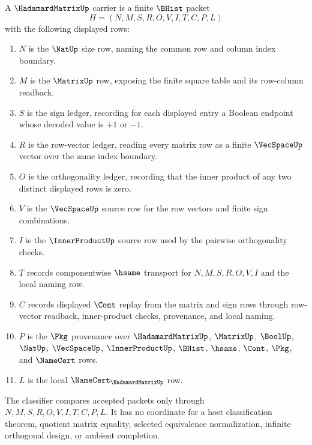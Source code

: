 \begin{definition}
\label{def:hadamard-matrix-carrier}
A $\HadamardMatrixUp$ carrier is a finite $\BHist$ packet
$$
H=(N,M,S,R,O,V,I,T,C,P,L)
$$
with the following displayed rows:
\begin{enumerate}
\item $N$ is the $\NatUp$ size row, naming the common row and column index boundary.
\item $M$ is the $\MatrixUp$ row, exposing the finite square table and its row-column readback.
\item $S$ is the sign ledger, recording for each displayed entry a Boolean endpoint whose decoded value is $+1$ or $-1$.
\item $R$ is the row-vector ledger, reading every matrix row as a finite $\VecSpaceUp$ vector over the same index boundary.
\item $O$ is the orthogonality ledger, recording that the inner product of any two distinct displayed rows is zero.
\item $V$ is the $\VecSpaceUp$ source row for the row vectors and finite sign combinations.
\item $I$ is the $\InnerProductUp$ source row used by the pairwise orthogonality checks.
\item $T$ records componentwise $\hsame$ transport for $N,M,S,R,O,V,I$ and the local naming row.
\item $C$ records displayed $\Cont$ replay from the matrix and sign rows through row-vector readback, inner-product checks, provenance, and local naming.
\item $P$ is the $\Pkg$ provenance over $\HadamardMatrixUp$, $\MatrixUp$, $\BoolUp$, $\NatUp$, $\VecSpaceUp$, $\InnerProductUp$, $\BHist$, $\hsame$, $\Cont$, $\Pkg$, and $\NameCert$ rows.
\item $L$ is the local $\NameCert_{\HadamardMatrixUp}$ row.
\end{enumerate}
The classifier compares accepted packets only through $N,M,S,R,O,V,I,T,C,P,L$. It has no coordinate for a host classification theorem, quotient matrix equality, selected equivalence normalization, infinite orthogonal design, or ambient completion.
\end{definition}

